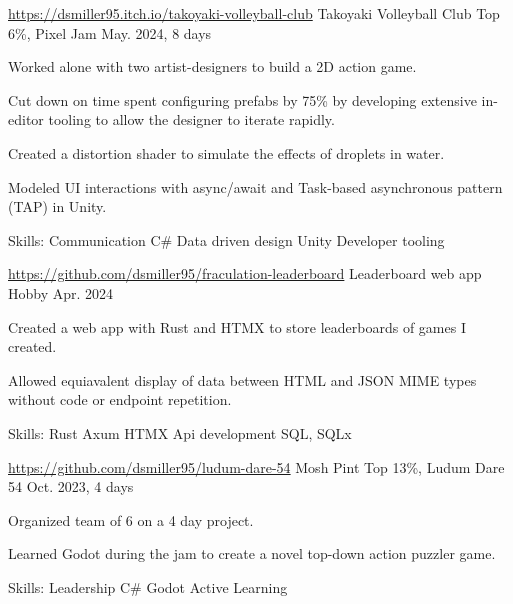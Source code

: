 \begin{cventries}
  \cventry
    {\href{https://dsmiller95.itch.io/takoyaki-volleyball-club}{https://dsmiller95.itch.io/takoyaki-volleyball-club}} %
    {Takoyaki Volleyball Club} %
    {Top 6\%, Pixel Jam} %
    {May. 2024, 8 days} %
    {
      \begin{cvitems} %
        \item {Worked alone with two artist-designers to build a 2D action game.}
        \item {Cut down on time spent configuring prefabs by 75\% by developing extensive in-editor tooling to allow the designer to iterate rapidly.}
        \item {Created a distortion shader to simulate the effects of droplets in water.}
        \item {Modeled UI interactions with async/await and Task-based asynchronous pattern (TAP) in Unity.}
        \item {Skills: Communication \textbullet{} C\# \textbullet{} Data driven design \textbullet{} Unity \textbullet{} Developer tooling }
      \end{cvitems}
    }


 \cventry
  {\href{https://github.com/dsmiller95/fraculation-leaderboard}{https://github.com/dsmiller95/fraculation-leaderboard}} %
   {Leaderboard web app} %
   {Hobby} %
   {Apr. 2024} %
   {
     \begin{cvitems} %
      \item {Created a web app with Rust and HTMX to store leaderboards of games I created.}
      \item {Allowed equiavalent display of data between HTML and JSON MIME types without code or endpoint repetition.}
      \item {Skills: Rust \textbullet{} Axum \textbullet{} HTMX \textbullet{} Api development \textbullet{} SQL, SQLx }
     \end{cvitems}
   }

  \cventry
   {\href{https://github.com/dsmiller95/ludum-dare-54}{https://github.com/dsmiller95/ludum-dare-54}} %
    {Mosh Pint} %
    {Top 13\%, Ludum Dare 54} %
    {Oct. 2023, 4 days} %
    {
      \begin{cvitems} %
        \item {Organized team of 6 on a 4 day project.}
        \item {Learned Godot during the jam to create a novel top-down action puzzler game.}
        \item {Skills: Leadership \textbullet{} C\# \textbullet{} Godot \textbullet{} Active Learning}
      \end{cvitems}
    }


\end{cventries}

